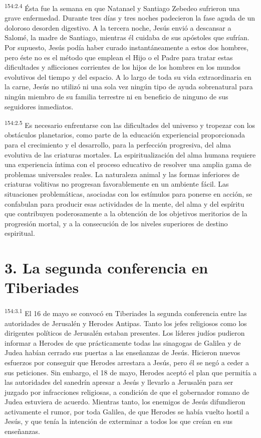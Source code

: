 \par 
\textsuperscript{154:2.4} Ésta fue la semana en que Natanael y Santiago Zebedeo sufrieron una grave enfermedad. Durante tres días y tres noches padecieron la fase aguda de un doloroso desorden digestivo. A la tercera noche, Jesús envió a descansar a Salomé, la madre de Santiago, mientras él cuidaba de sus apóstoles que sufrían. Por supuesto, Jesús podía haber curado instantáneamente a estos dos hombres, pero éste no es el método que emplean el Hijo o el Padre para tratar estas dificultades y aflicciones corrientes de los hijos de los hombres en los mundos evolutivos del tiempo y del espacio. A lo largo de toda su vida extraordinaria en la carne, Jesús no utilizó ni una sola vez ningún tipo de ayuda sobrenatural para ningún miembro de su familia terrestre ni en beneficio de ninguno de sus seguidores inmediatos.

\par 
\textsuperscript{154:2.5} Es necesario enfrentarse con las dificultades del universo y tropezar con los obstáculos planetarios, como parte de la educación experiencial proporcionada para el crecimiento y el desarrollo, para la perfección progresiva, del alma evolutiva de las criaturas mortales. La espiritualización del alma humana requiere una experiencia íntima con el proceso educativo de resolver una amplia gama de problemas universales reales. La naturaleza animal y las formas inferiores de criaturas volitivas no progresan favorablemente en un ambiente fácil. Las situaciones problemáticas, asociadas con los estímulos para ponerse en acción, se confabulan para producir esas actividades de la mente, del alma y del espíritu que contribuyen poderosamente a la obtención de los objetivos meritorios de la progresión mortal, y a la consecución de los niveles superiores de destino espiritual.

\section*{3. La segunda conferencia en Tiberiades}
\par 
\textsuperscript{154:3.1} El 16 de mayo se convocó en Tiberiades la segunda conferencia entre las autoridades de Jerusalén y Herodes Antipas. Tanto los jefes religiosos como los dirigentes políticos de Jerusalén estaban presentes. Los líderes judíos pudieron informar a Herodes de que prácticamente todas las sinagogas de Galilea y de Judea habían cerrado sus puertas a las enseñanzas de Jesús. Hicieron nuevos esfuerzos por conseguir que Herodes arrestara a Jesús, pero él se negó a ceder a sus peticiones. Sin embargo, el 18 de mayo, Herodes aceptó el plan que permitía a las autoridades del sanedrín apresar a Jesús y llevarlo a Jerusalén para ser juzgado por infracciones religiosas, a condición de que el gobernador romano de Judea estuviera de acuerdo. Mientras tanto, los enemigos de Jesús difundieron activamente el rumor, por toda Galilea, de que Herodes se había vuelto hostil a Jesús, y que tenía la intención de exterminar a todos los que creían en sus enseñanzas.

